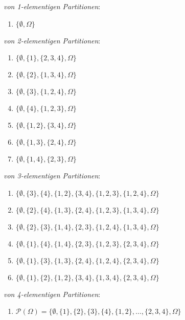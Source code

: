 \documentclass[11pt,a4paper,ngerman]{article}
\newcommand{\set}[1]{ \{ #1 \}}
\begin{document}
\emph{von 1-elementigen Partitionen}:
\begin{enumerate}[$\xi^1_1 = $]
\item $\{\emptyset, \Omega \}$
\end{enumerate}
\emph{von 2-elementigen Partitionen}:
\begin{enumerate}[$\xi^2_1 = $]
\item $\set{\emptyset, \set{1}, \set{2,3,4}, \Omega}$
\item $\set{\emptyset, \set{2}, \set{1,3,4},\Omega}$
\item $\set{\emptyset, \set{3}, \set{1,2,4},\Omega}$
\item $\set{\emptyset, \set{4}, \set{1,2,3},\Omega}$
\item $\{\emptyset, \set{1,2}, \set{3,4}, \Omega \}$
\item $\{\emptyset, \set{1,3}, \set{2,4}, \Omega \}$
\item $\{\emptyset, \set{1,4}, \set{2,3}, \Omega \}$
\end{enumerate}
\emph{von 3-elementigen Partitionen}:
\begin{enumerate}[$\xi^3_1 = $]
\item $\{\emptyset, \set{3}, \set{4}, \set{1,2}, \set{3,4}, \set{1,2,3}, \set{1,2,4}, \Omega \}$
\item $\{\emptyset, \set{2}, \set{4}, \set{1,3}, \set{2,4}, \set{1,2,3}, \set{1,3,4}, \Omega \}$
\item $\{\emptyset, \set{2}, \set{3}, \set{1,4}, \set{2,3}, \set{1,2,4}, \set{1,3,4}, \Omega \}$
\item $\{\emptyset, \set{1}, \set{4}, \set{1,4}, \set{2,3}, \set{1,2,3}, \set{2,3,4}, \Omega \}$
\item $\{\emptyset, \set{1}, \set{3}, \set{1,3}, \set{2,4}, \set{1,2,4}, \set{2,3,4}, \Omega \}$
\item $\{\emptyset, \set{1}, \set{2}, \set{1,2}, \set{3,4}, \set{1,3,4}, \set{2,3,4}, \Omega \}$
\end{enumerate}
\emph{von 4-elementigen Partitionen}:
\begin{enumerate}[$\xi^4_1 = $]
\item $\mathcal{P}(\Omega) = \{\emptyset, \set{1},\set{2},\set{3}, \set{4}, \set{1,2}, \ldots, \set{2,3,4}, \Omega \}$
\end{enumerate}
\end{document}
